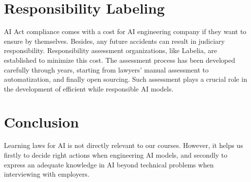 \section{Responsibility Labeling}
AI Act compliance comes with a cost for AI engineering company if they want to ensure by themselves. Besides, any future accidents can result in judiciary responsibility. Responsibility assessment organizations, like Labelia, are established to minimize this cost. The assessment process has been developed carefully through years, starting from lawyers' manual assessment to automatization, and finally open sourcing. Such assessment plays a crucial role in the development of efficient while responsible AI models.

\section{Conclusion}

Learning laws for AI is not directly relevant to our courses. However, it helps us firstly to decide right actions when engineering AI models, and secondly to express an adequate knowledge in AI beyond technical problems when interviewing with employers.